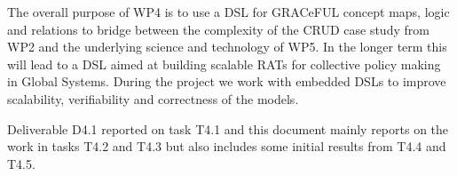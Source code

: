 The overall purpose of WP4 is to use a DSL for GRACeFUL concept maps,
logic and relations to bridge between the complexity of the CRUD case
study from WP2 and the underlying science and technology of WP5.  In
the longer term this will lead to a DSL aimed at building scalable
RATs for collective policy making in Global Systems.  During the
project we work with embedded DSLs to improve scalability,
verifiability and correctness of the models.

Deliverable D4.1 reported on task T4.1 and this document mainly
reports on the work in tasks T4.2 and T4.3 but also includes some
initial results from T4.4 and T4.5.


